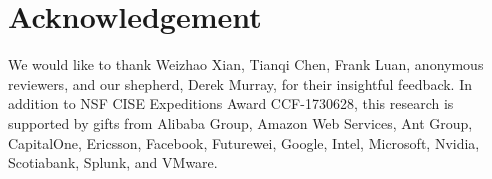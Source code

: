 \section{Acknowledgement}
\label{sec:acknowledgement}

We would like to thank Weizhao Xian, Tianqi Chen, Frank Luan, anonymous reviewers, and our shepherd, Derek Murray, for their insightful feedback.
In addition to NSF CISE Expeditions Award CCF-1730628, this research is supported by gifts from Alibaba Group, Amazon Web Services, Ant Group, CapitalOne, Ericsson, Facebook, Futurewei, Google, Intel, Microsoft, Nvidia, Scotiabank, Splunk, and VMware.


